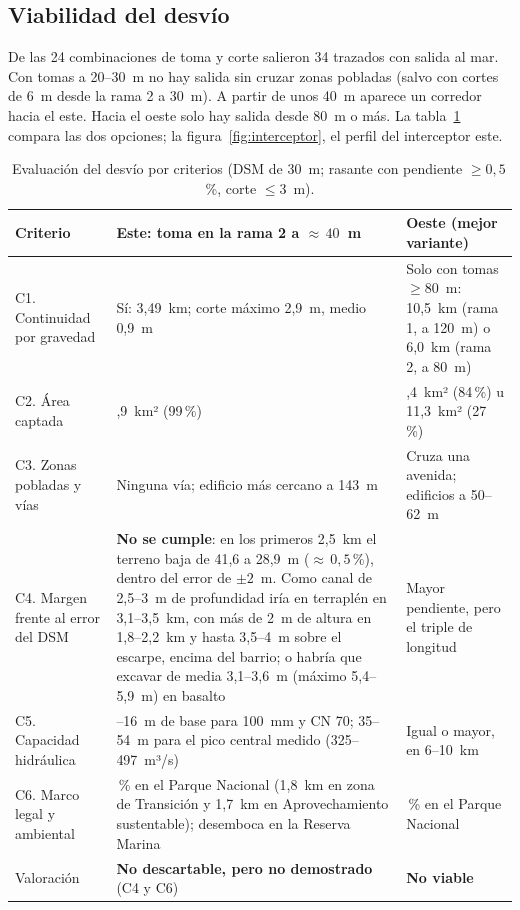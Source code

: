 \documentclass{sosg-informe}
\begin{document}
\subsection{Viabilidad del desvío}
De las 24 combinaciones de toma y corte salieron 34 trazados con salida al mar. Con tomas a 20--30~m no hay salida sin cruzar zonas pobladas (salvo con cortes de 6~m desde la rama 2 a 30~m). A partir de unos 40~m aparece un corredor hacia el este. Hacia el oeste solo hay salida desde 80~m o más. La tabla~\ref{tab:desvio} compara las dos opciones; la figura~\ref{fig:interceptor}, el perfil del interceptor este.

\begin{table}[ht]
  \centering\small
  \caption{Evaluación del desvío por criterios (DSM de 30~m; rasante con pendiente $\geq 0,5$\,\%, corte $\leq 3$~m).}
  \label{tab:desvio}
  \begin{tabularx}{\linewidth}{>{\raggedright\arraybackslash}p{2.9cm}>{\raggedright\arraybackslash}X>{\raggedright\arraybackslash}p{3.6cm}}
    \toprule
    Criterio & Este: toma en la rama 2 a ${\approx}\,40$~m & Oeste (mejor variante) \\
    \midrule
    C1. Continuidad por gravedad & Sí: 3,49~km; corte máximo 2,9~m, medio 0,9~m & Solo con tomas $\geq 80$~m: 10,5~km (rama 1, a 120~m) o 6,0~km (rama 2, a 80~m) \\
    C2. Área captada & 41,9~km² (99\,\%) & 35,4~km² (84\,\%) u 11,3~km² (27\,\%) \\
    C3. Zonas pobladas y vías & Ninguna vía; edificio más cercano a 143~m & Cruza una avenida; edificios a 50--62~m \\
    C4. Margen frente al error del DSM & \textbf{No se cumple}: en los primeros 2,5~km el terreno baja de 41,6 a 28,9~m (${\approx}\,0,5$\,\%), dentro del error de $\pm 2$~m. Como canal de 2,5--3~m de profundidad iría en terraplén en 3,1--3,5~km, con más de 2~m de altura en 1,8--2,2~km y hasta 3,5--4~m sobre el escarpe, encima del barrio; o habría que excavar de media 3,1--3,6~m (máximo 5,4--5,9~m) en basalto & Mayor pendiente, pero el triple de longitud \\
    C5. Capacidad hidráulica & 8--16~m de base para 100~mm y CN 70; 35--54~m para el pico central medido (325--497~m³/s) & Igual o mayor, en 6--10~km \\
    C6. Marco legal y ambiental & 100\,\% en el Parque Nacional (1,8~km en zona de Transición y 1,7~km en Aprovechamiento sustentable); desemboca en la Reserva Marina & 100\,\% en el Parque Nacional \\
    \midrule
    Valoración & \textbf{No descartable, pero no demostrado} (C4 y C6) & \textbf{No viable} \\
    \bottomrule
  \end{tabularx}
\end{table}
\end{document}
